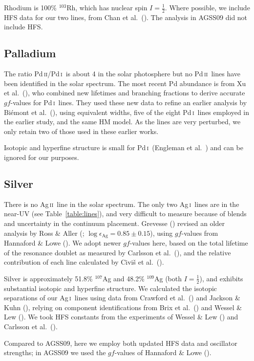 \documentclass[traditabstract]{aa}
\newcommand{\altpdi}{Pd\,\textsc{i}}
\newcommand{\altpdii}{Pd\,\textsc{ii}}
\newcommand{\altagi}{Ag\,\textsc{i}}
\newcommand{\altagii}{Ag\,\textsc{ii}}
\newcommand{\pdi}{\altpdi\ }
\newcommand{\pdii}{\altpdii\ }
\newcommand{\agi}{\altagi\ }
\newcommand{\agii}{\altagii\ }
\begin{document}
Rhodium is 100\% $^{103}$Rh, which has nuclear spin $I=\frac12$.  Where possible, we include HFS data for our two lines, from Chan et al.\ (\cite{Chan}).  The analysis in AGSS09 did not include HFS.

\subsection{Palladium}
The ratio \altpdii/\pdi is about 4 in the solar photosphere but no \pdii lines have been identified in the solar spectrum. The most recent Pd abundance is from Xu et al.\ (\cite{xu}), who combined new lifetimes and branching fractions to derive accurate $gf$-values for \pdi lines. They used these new data to refine an earlier analysis by Bi\'emont et al.\ (\cite{biem5}), using equivalent widths, five of the eight \pdi lines employed in the earlier study, and the same HM model.  As the lines are very perturbed, we only retain two of those used in these earlier works.

Isotopic and hyperfine structure is small for \pdi (Engleman et al.\ \cite{Engleman}) and can be ignored for our purposes.

\subsection{Silver}
There is no \agii line in the solar spectrum. The only two \agi lines are in the near-UV (see Table~\ref{table:lines}), and very difficult to measure because of blends and uncertainty in the continuum placement. Grevesse (\cite{grev}) revised an older analysis by Ross \& Aller (\cite{ross2}; $\log\epsilon_{\mathrm{Ag}}=0.85\pm0.15$), using $gf$-values from Hannaford \& Lowe (\cite{hann3}).  We adopt newer $gf$-values here, based on the total lifetime of the resonance doublet as measured by Carlsson et al.\ (\cite{carl2}), and the relative contribution of each line calculated by Civi\v{s} et al.\ (\cite{civis}).

Silver is approximately 51.8\% $^{107}$Ag and 48.2\% $^{109}$Ag (both $I=\frac12$), and exhibits substantial isotopic and hyperfine structure.  We calculated the isotopic separations of our \agi lines using data from Crawford et al.\ (\cite{craw}) and Jackson \& Kuhn (\cite{jack}), relying on component identifications from Brix et al.\ (\cite{brix}) and Wessel \& Lew (\cite{wess}).  We took HFS constants from the experiments of Wessel \& Lew (\cite{wess}) and Carlsson et al.\ (\cite{carl2}).

Compared to AGSS09, here we employ both updated HFS data and oscillator strengths; in AGSS09 we used the $gf$-values of Hannaford \& Lowe (\cite{hann3}).
\end{document}
